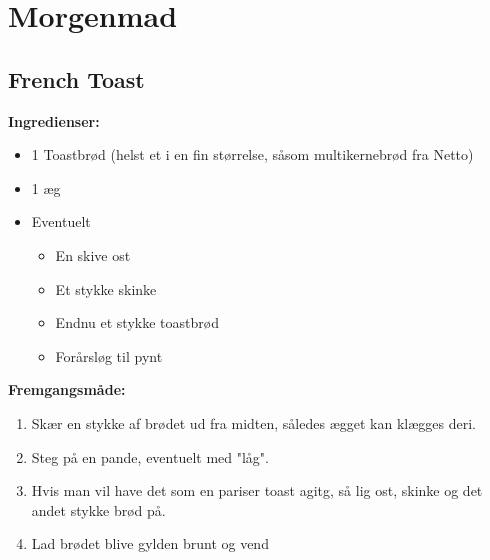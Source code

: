 \documentclass{book}
\begin{document}
\chapter{Morgenmad}
\minitoc
\newpage \section{French Toast}
\begin{minipage}[t]{0.5\textwidth}
\textbf{Ingredienser:}
\begin{itemize}
    \item 1 Toastbrød (helst et i en fin størrelse, såsom multikernebrød fra Netto)
    \item 1 æg
    \item Eventuelt
    \begin{itemize}
        \item En skive ost
        \item Et stykke skinke
        \item Endnu et stykke toastbrød
        \item Forårsløg til pynt
    \end{itemize}
\end{itemize}
\end{minipage}
\begin{minipage}[t]{0.5\textwidth}
\textbf{Fremgangsmåde:}
\begin{enumerate}
    \item Skær en stykke af brødet ud fra midten, således ægget kan klægges deri.
    \item Steg på en pande, eventuelt med "låg".
    \item Hvis man vil have det som en pariser toast agitg, så lig ost, skinke og det andet stykke brød på.
    \item Lad brødet blive gylden brunt og vend
\end{enumerate}
\end{minipage}
\newpage {}
\end{document}
